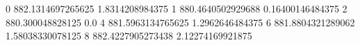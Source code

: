 0 882.1314697265625 1.8314208984375
1 880.4640502929688 0.16400146484375
2 880.300048828125 0.0
4 881.5963134765625 1.2962646484375
6 881.8804321289062 1.58038330078125
8 882.4227905273438 2.12274169921875
